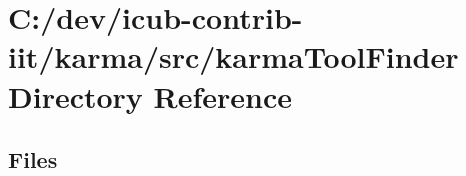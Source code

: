\section{C\+:/dev/icub-\/contrib-\/iit/karma/src/karma\+Tool\+Finder Directory Reference}
\label{dir_29c9db2f94dd348f3d685c9fccd668c5}
\subsection*{Files}
\begin{DoxyCompactItemize}
\end{DoxyCompactItemize}
